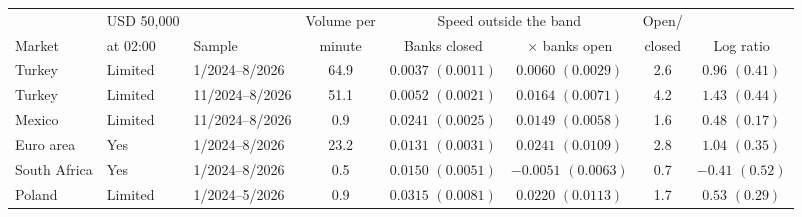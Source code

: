 \begin{tabular}{lllccccc}
\toprule
 & USD 50{,}000 & & Volume per & \multicolumn{2}{c}{Speed outside the band} & Open/ & \\
\cmidrule(lr){5-6}
Market & at 02:00 & Sample & minute & Banks closed & $\times$ banks open & closed & Log ratio \\
\midrule
Turkey & Limited & 1/2024--8/2026 & 64.9 & $0.0037$ $(0.0011)$ & $0.0060$ $(0.0029)$ & 2.6 & $0.96$ $(0.41)$ \\
Turkey & Limited & 11/2024--8/2026 & 51.1 & $0.0052$ $(0.0021)$ & $0.0164$ $(0.0071)$ & 4.2 & $1.43$ $(0.44)$ \\
Mexico & Limited & 11/2024--8/2026 & 0.9 & $0.0241$ $(0.0025)$ & $0.0149$ $(0.0058)$ & 1.6 & $0.48$ $(0.17)$ \\
Euro area & Yes & 1/2024--8/2026 & 23.2 & $0.0131$ $(0.0031)$ & $0.0241$ $(0.0109)$ & 2.8 & $1.04$ $(0.35)$ \\
South Africa & Yes & 1/2024--8/2026 & 0.5 & $0.0150$ $(0.0051)$ & $-0.0051$ $(0.0063)$ & 0.7 & $-0.41$ $(0.52)$ \\
Poland & Limited & 1/2024--5/2026 & 0.9 & $0.0315$ $(0.0081)$ & $0.0220$ $(0.0113)$ & 1.7 & $0.53$ $(0.29)$ \\
\bottomrule
\end{tabular}

